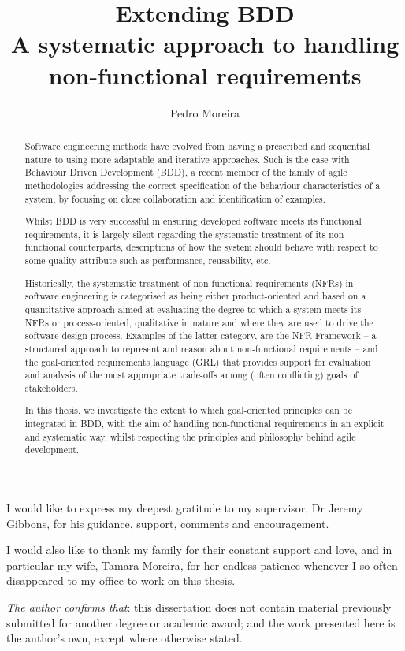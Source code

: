 \documentclass[dissertation,final]{softeng}
\title{Extending BDD\\A systematic approach to handling non-functional requirements}
\author{Pedro Moreira}
\begin{document}
\maketitle


\begin{abstract}
Software engineering methods have evolved from having a prescribed and sequential nature to using more adaptable and iterative approaches. Such is the case with Behaviour Driven Development (BDD), a recent member of the family of agile methodologies addressing the correct specification of the behaviour characteristics of a system, by focusing on close collaboration and identification of examples.

Whilst BDD is very successful in ensuring developed software meets its functional requirements, it is largely silent regarding the systematic treatment of its non-functional counterparts, descriptions of how the system should behave with respect to some quality attribute such as performance, reusability, etc.

Historically, the systematic treatment of non-functional requirements (NFRs) in software engineering is categorised as being either product-oriented and based on a quantitative approach aimed at evaluating the degree to which a system meets its NFRs or process-oriented, qualitative in nature and where they are used to drive the software design process. Examples of the latter category, are the NFR Framework -- a structured approach to represent and reason about non-functional requirements -- and the goal-oriented requirements language (GRL) that provides support for evaluation and analysis of the most appropriate trade-offs among (often conflicting) goals of stakeholders. 

In this thesis, we investigate the extent to which goal-oriented principles can be integrated in BDD, with the aim of handling non-functional requirements in an explicit and systematic way, whilst respecting the principles and philosophy behind agile development.
\end{abstract}

\clearpage

\begin{acknowledgements}
  I would like to express my deepest gratitude to my supervisor, Dr Jeremy Gibbons, for his
  guidance, support, comments and encouragement.
  
  I would also like to thank my family for their constant support and love, and in particular my wife, Tamara Moreira, for her endless patience whenever I so often disappeared to my office to work on this thesis.
  
  \emph{The author confirms that}: this dissertation does not contain material previously submitted for another degree or academic award; and the work presented here is the author's own, except where otherwise stated.
\end{acknowledgements}
\end{document}
